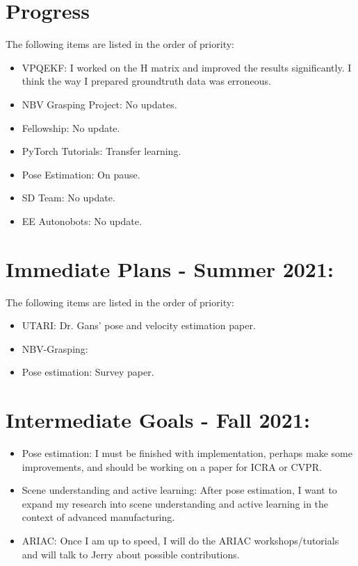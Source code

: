 \documentclass[11pt]{article}
\begin{document}
\section{Progress}
The following items are listed in the order of priority:
\begin{itemize}
      \item VPQEKF: I worked on the H matrix and improved the results significantly.
      I think the way I prepared groundtruth data was erroneous.

      \item NBV Grasping Project: No updates.
      \item Fellowship: No update.
      \item PyTorch Tutorials: Transfer learning.
      \item Pose Estimation: On pause.
      \item SD Team: No update.
      \item EE Autonobots: No update.
\end{itemize}


\section{Immediate Plans - Summer 2021:}
The following items are listed in the order of priority:

\begin{itemize}
      \item UTARI: Dr. Gans' pose and velocity estimation paper.
      \item NBV-Grasping:
      \item Pose estimation: Survey paper.
\end{itemize}

\section{Intermediate Goals - Fall 2021:}
\begin{itemize}
      \item Pose estimation: I must be finished with implementation, perhaps make some improvements, and should be working on a paper for ICRA or CVPR.
      \item Scene understanding and active learning: After pose estimation, I want to expand my research into scene understanding and active learning in the context of advanced manufacturing.
      \item ARIAC: Once I am up to speed, I will do the ARIAC workshops/tutorials and will talk to Jerry about possible contributions.
\end{itemize}


\newpage


\end{document}
